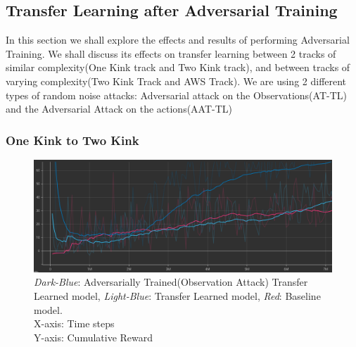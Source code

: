 \subsection{Transfer Learning after Adversarial Training }
In this section we shall explore the effects and results of performing Adversarial Training. We shall discuss its effects on transfer learning between 2 tracks of similar complexity(One Kink track and Two Kink track), and between tracks of varying complexity(Two Kink Track and AWS Track).
We are using 2 different types of random noise attacks: Adversarial attack on the Observations(AT-TL) and the Adversarial Attack on the actions(AAT-TL)

\subsubsection{One Kink to Two Kink}

\begin{figure}[H]
    \centering
    \includegraphics[width=1.0\textwidth]{images/graphs/AT-TL-OneKink-TwoKink.png}
    \caption{\centering \textit{Dark-Blue}: Adversarially Trained(Observation Attack) Transfer Learned model, \textit{Light-Blue}: Transfer Learned model, \textit{Red}: Baseline model. \\ X-axis: Time steps \\ Y-axis: Cumulative Reward }
   
    
    \label{fig:my_label}
\end{figure}


